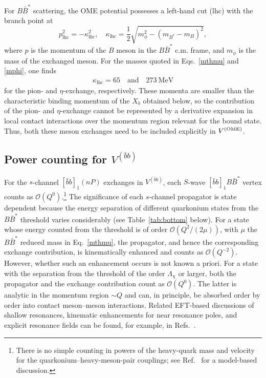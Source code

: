 \documentclass[aps,prd,showpacs,amsmath,twocolumn,superscriptaddress,floatfix,nofootinbib,notitlepage]{revtex4-2}
\newcommand{\bbnP}{[\bar{b}b]_1(nP)}
\newcommand{\be}{\begin{equation}}
\newcommand{\ee}{\end{equation}}
\newcommand{\Xb}{X_b}
\newcommand{\VQQ}{V^{(\bar{b}b)}}
\newcommand{\VOME}{V^{\rm (OME)}}
\begin{document}
For $B\bar{B}^*$ scattering, the OME potential possesses a left-hand cut (lhc)
with the branch point at 
\be
p_{\mathrm{lhc}}^2= - \kappa_{\mathrm{lhc}}^2, \quad \kappa_{\mathrm{lhc}}= \frac{1}{2}\sqrt{m_\phi^2-\left(m_{B^*}-m_B\right)^2},
\label{eq:lhc-formula}
\ee
where $p$ is the momentum of the $B$ meson in the $B\bar{B}^*$ c.m. frame, and $m_\phi$ is the mass of the exchanged meson. For the masses quoted in Eqs.~\eqref{mthmu} and \eqref{mphi}, one finds 
\begin{align}
\kappa_{\mathrm{lhc}} = 65\quad\mbox{and} \quad 273~\mbox{MeV}
\label{eq:lhc-OME}
\end{align}
for the pion- and $\eta$-exchange, respectively.
These momenta are smaller than the characteristic binding momentum of the $\Xb$ obtained below, so 
the contribution of the pion- and $\eta$-exchange cannot be represented by a derivative expansion in local contact interactions over the momentum region relevant for the bound state. Thus, both these meson exchanges need to be included explicitly in $\VOME$. 

\subsection{Power counting for $\VQQ$}
\label{sec:bbcounting}

For the $s$-channel $\bbnP$ exchanges in $\VQQ$, each $S$-wave $[\bar{b}b]_1B\bar{B}^*$ vertex counts as $\mathcal{O}(Q^0)$.\footnote{There is no simple counting in powers of the heavy-quark mass and velocity for the quarkonium--heavy-meson-pair couplings; see Ref.~\cite{Guo:2010ak} for a model-based discussion.} The significance of each $s$-channel propagator is state dependent because the energy separation of different quarkonium states from the $B\bar{B}^*$ threshold varies considerably (see Table~\ref{tab:bottom} below). For a state whose energy counted from the threshold is of order $\mathcal{O}(Q^2/(2\mu))$, with $\mu$ the $B\bar{B}^*$ reduced mass in Eq.~\eqref{mthmu}, the propagator, and hence the corresponding exchange contribution, is kinematically enhanced and counts as $\mathcal{O}(Q^{-2})$. However, whether such an enhancement occurs is not known a priori.
For a state with the separation from the threshold of the order $\Lambda_\chi$ or larger, both the propagator and the exchange contribution count as $\mathcal{O}(Q^0)$. The latter is analytic in the momentum region $\sim Q$ and can, in principle, be absorbed order by order into contact meson--meson interactions. Related EFT-based discussions of shallow resonances, kinematic enhancements for near resonance poles, and explicit resonance fields can be found, for example, in Refs.~\cite{Bedaque:2003wa,Alhakami:2017ntb,Habashi:2020qgw,Habashi:2020ofb}. 
 
\end{document}
